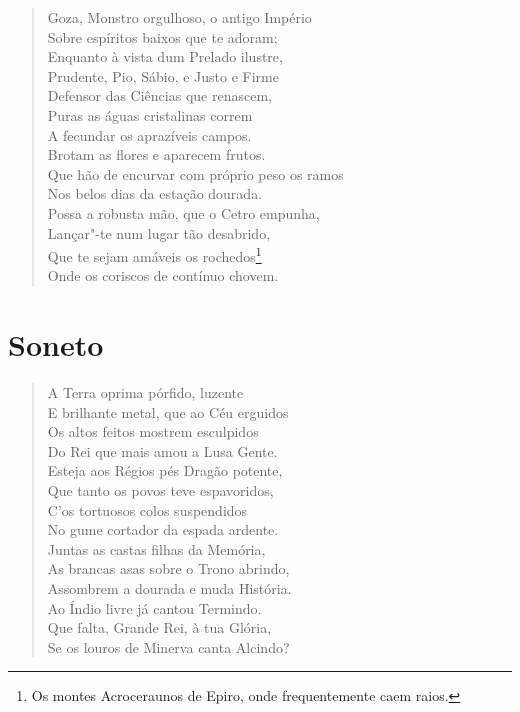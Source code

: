 \begin{verse}
Goza, Monstro orgulhoso, o antigo Império\\
Sobre espíritos baixos que te adoram;\\
Enquanto à vista dum Prelado ilustre,\\
Prudente, Pio, Sábio, e Justo e Firme\\ %
Defensor das Ciências que renascem,\\
Puras as águas cristalinas correm\\
A fecundar os aprazíveis campos.\\
Brotam as flores e aparecem frutos.\\
Que hão de encurvar com próprio peso os ramos\\
Nos belos dias da estação dourada.\\
Possa a robusta mão, que o Cetro empunha,\\
Lançar"-te num lugar tão desabrido,\\
Que te sejam amáveis os rochedos\footnote{ Os montes Acroceraunos de
Epiro, onde frequentemente caem raios.}\\
Onde os coriscos de contínuo chovem. \\[10pt]
\end{verse}

\pagebreak

\chapter{Soneto}

\begin{verse}


A Terra oprima pórfido, luzente\\		\index{\Porf}
E brilhante metal, que ao Céu erguidos\\
Os altos feitos mostrem esculpidos\\
Do Rei que mais amou a Lusa Gente. \\[10pt]


Esteja aos Régios pés Dragão potente,\\
Que tanto os povos teve espavoridos,\\
C'os tortuosos colos suspendidos\\
No gume cortador da espada ardente. \\[10pt]


Juntas as castas filhas da Memória,\\		\index{\Filmemo}
As brancas asas sobre o Trono abrindo,\\
Assombrem a dourada e muda História. \\[10pt]


Ao Índio livre já cantou Termindo.\\		\index{\Termin}
Que falta, Grande Rei, à tua Glória,\\
Se os louros de Minerva canta Alcindo? \\[10pt]		\index{\Lour}		\index{\Miner}

\vspace*{2em}
\end{verse}

